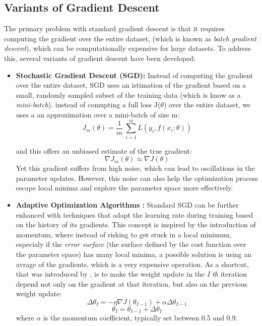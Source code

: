 \subsection{Variants of Gradient Descent}

The primary problem with standard gradient descent is that it requires computing the gradient over the entire dataset, (which is known as \textit{batch gradient descent}), which can be computationally expensive for large datasets. To address this, several variants of gradient descent have been developed:

\begin{itemize}
	\item \textbf{Stochastic Gradient Descent (SGD):} Instead of computing the gradient over the entire dataset, SGD uses an istimation of the gradient based on a small, randomly sampled subset of the training data (which is know as a \textit{mini-batch}).
	instead of comupting a full loss J($\theta$) over the entire dataset, we uses a an approximation over a mini-batch of size m:
	\[
	J_{m}(\theta) = \frac{1}{m} \ \sum_{i=1}^{m} L(y_i, f(x_i; \theta))
	\]
	
	and this offers an unbiased estimate of the true gradient:
	\[\nabla J_{m}(\theta) \approx \nabla J(\theta)\]
	Yet this gradient suffers from high noise, which can lead to oscillations in the parameter updates. However, this noise can also help the optimization process escape local minima and explore the parameter space more effectively.
	
	\item \textbf{Adaptive Optimization Algorithms :} Standard SGD can be further enhanced with techniques that adapt the learning rate during training based on the history of its gradients.
	This concept is inspired by the introduction of momentum, where instead of risking to get stuck in a local minimum, especialy if the \textit{error surface} (the surface defined by the cost function over the parameter space) has many local minima, a possible solution is using an avrage of the gradients, which is a very expensive operation. As a shortcut, that was introduced by \citep{Rumelhart1986}, is to make the weight update in the \textit{I th} iteration depend not only on the gradient at that iteration, but also on the previous weight update:
	\[
	\Delta \theta_{I} = -\eta \nabla J(\theta_{I-1}) + \alpha \Delta \theta_{I-1}
	\]
	\[
	\theta_{I} = \theta_{I-1} + \Delta \theta_{I}
	\]
	where $\alpha$ is the momentum coefficient, typically set between 0.5 and 0.9.
	

\end{itemize}
